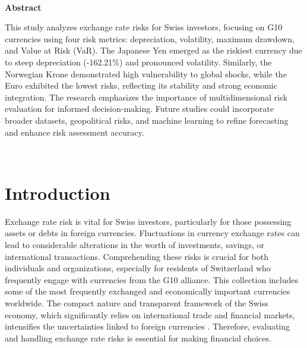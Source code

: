 \documentclass[11pt,a4paper,english,oneside]{book}
\begin{document}
\thispagestyle{empty}
\titleGP\
\newpage

{\LARGE \textbf{Abstract}}

This study analyzes exchange rate risks for Swiss investors, focusing on G10 currencies using four risk metrics: depreciation, volatility, maximum drawdown, and Value at Risk (VaR). The Japanese Yen emerged as the riskiest currency due to steep depreciation (-162.21\%) and pronounced volatility. Similarly, the Norwegian Krone demonstrated high vulnerability to global shocks, while the Euro exhibited the lowest risks, reflecting its stability and strong economic integration. The research emphasizes the importance of multidimensional risk evaluation for informed decision-making. Future studies could incorporate broader datasets, geopolitical risks, and machine learning to refine forecasting and enhance risk assessment accuracy.

\doublespacing\
\setcounter{page}{1}


\tableofcontents
\listoffigures




\chapter{Introduction}

Exchange rate risk is vital for Swiss investors, particularly for those possessing assets or debts in foreign currencies. Fluctuations in currency exchange rates can lead to considerable alterations in the worth of investments, savings, or international transactions. Comprehending these risks is crucial for both individuals and organizations, especially for residents of Switzerland who frequently engage with currencies from the G10 alliance. This collection includes some of the most frequently exchanged and economically important currencies worldwide. The compact nature and transparent framework of the Swiss economy, which significantly relies on international trade and financial markets, intensifies the uncertainties linked to foreign currencies \parencite{frohm2024strengthening}. Therefore, evaluating and handling exchange rate risks is essential for making financial choices.
\end{document}
